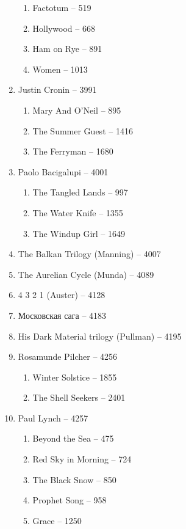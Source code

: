 \documentclass[a4paper, 11pt]{proc} %
\begin{document}
\begin{enumerate}
\begin{enumerate}
            \item Factotum -- 519
            \item Hollywood -- 668
            \item Ham on Rye -- 891
            \item Women -- 1013
        \end{enumerate}
    \item Justin Cronin -- 3991
        \begin{enumerate}
            \item Mary And O'Neil -- 895
            \item The Summer Guest -- 1416
            \item The Ferryman -- 1680
        \end{enumerate}
    \item Paolo Bacigalupi -- 4001
        \begin{enumerate}
            \item The Tangled Lands -- 997
            \item The Water Knife -- 1355
            \item The Windup Girl -- 1649
        \end{enumerate}
    \item The Balkan Trilogy (Manning) -- 4007
    \item The Aurelian Cycle (Munda) -- 4089
    \item 4 3 2 1 (Auster) -- 4128
    \item Московская сага -- 4183
    \item His Dark Material trilogy (Pullman) -- 4195
    \item Rosamunde Pilcher -- 4256
        \begin{enumerate}
            \item Winter Solstice -- 1855
            \item The Shell Seekers -- 2401
        \end{enumerate}
    \item Paul Lynch -- 4257
        \begin{enumerate}
            \item Beyond the Sea -- 475
            \item Red Sky in Morning -- 724
            \item The Black Snow -- 850
            \item Prophet Song -- 958
            \item Grace -- 1250
        \end{enumerate}

\end{enumerate}
\end{document}
